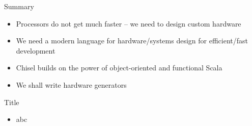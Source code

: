 \begin{frame}[fragile]{Summary}
\begin{itemize}
\item Processors do not get much faster -- we need to design custom hardware
\item We need a modern language for hardware/systems design for efficient/fast development
\item Chisel builds on the power of object-oriented and functional Scala
\item We shall write hardware generators
\end{itemize}
\end{frame}




\begin{frame}[fragile]{Title}
\begin{itemize}
\item abc
\end{itemize}
\end{frame}
